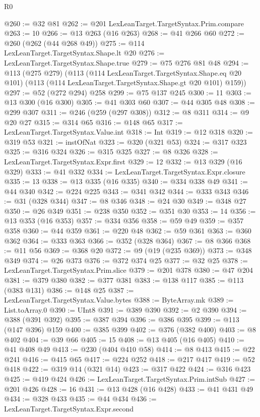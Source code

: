 \begin{lexlean}{R0}
\begin{coremodule}
{{{{{{{{{{{{{{{{{{{{{{{{{{{{{{{{{{{{{{{{{{{{{{{{{{{{{{{{{{{{{{{{{{{{{{{{{@260 := @32 @81
@262 := @201 LexLeanTarget.TargetSyntax.Prim.compare
@263 := 10
@266 := @13 @263 (@16 @263)
@268 := @41 @266 @60
@272 := @260 (@262 (@44 @268 @49))
@275 := @114 LexLeanTarget.TargetSyntax.Shape.lt @20
@276 := LexLeanTarget.TargetSyntax.Shape.true
@279 := @75 @276 @81 @48
@294 := @113
    (@275 @279)
    (@113
      (@114 LexLeanTarget.TargetSyntax.Shape.eq @20 @101)
      (@113 (@114 LexLeanTarget.TargetSyntax.Shape.gt @20 @101) @159))
@297 := @52 (@272 @294) @258
@299 := @75 @137 @245
@300 := 11
@303 := @13 @300 (@16 @300)
@305 := @41 @303 @60
@307 := @44 @305 @48
@308 := @299 @307
@311 := @246 (@259 (@297 @308))
@312 := @8 @311
@314 := @9 @20 @27
@315 := @314 @65
@316 := @148 @65
@317 := LexLeanTarget.TargetSyntax.Value.int
@318 := Int
@319 := @12 @318
@320 := @319 @53
@321 := instOfNat
@323 := @320 (@321 @53)
@324 := @317 @323
@325 := @316 @324
@326 := @315 @325
@327 := @8 @326
@328 := LexLeanTarget.TargetSyntax.Expr.first
@329 := 12
@332 := @13 @329 (@16 @329)
@333 := @41 @332
@334 := LexLeanTarget.TargetSyntax.Expr.closure
@335 := 13
@338 := @13 @335 (@16 @335)
@340 := @334 @338 @49
@341 := @44 @340
@342 := @224 @225
@343 := @341 @342
@344 := @333 @343
@346 := @31 (@328 @344)
@347 := @8 @346
@348 := @24 @30
@349 := @348 @27
@350 := @26 @349
@351 := @238 @350
@352 := @351 @30
@353 := 14
@356 := @13 @353 (@16 @353)
@357 := @334 @356
@358 := @59 @49
@359 := @357 @358
@360 := @44 @359
@361 := @220 @48
@362 := @59 @361
@363 := @360 @362
@364 := @333 @363
@366 := @352 (@328 @364)
@367 := @8 @366
@368 := @11 @56
@369 := @368 @20
@372 := @9 (@19 (@235 @369))
@373 := @348 @349
@374 := @26 @373
@376 := @372 @374 @25
@377 := @32 @25
@378 := LexLeanTarget.TargetSyntax.Prim.slice
@379 := @201 @378
@380 := @47 @204
@381 := @379 @380
@382 := @377 @381
@383 := @138 @117
@385 := @113 (@383 @131)
@386 := @148 @25
@387 := LexLeanTarget.TargetSyntax.Value.bytes
@388 := ByteArray.mk
@389 := List.toArray.{0}
@390 := UInt8
@391 := @389 @390
@392 := @2 @390
@394 := @388 (@391 @392)
@395 := @387 @394
@396 := @386 @395
@399 := @113 (@147 @396) @159
@400 := @385 @399
@402 := @376 (@382 @400)
@403 := @8 @402
@404 := @39 @66
@405 := 15
@408 := @13 @405 (@16 @405)
@410 := @41 @408 @49
@413 := @230 (@404 @410 @58)
@414 := @8 @413
@415 := @22 @241
@416 := @415 @65
@417 := @224 @252
@418 := @217 @417
@419 := @52 @418
@422 := @319 @14 (@321 @14)
@423 := @317 @422
@424 := @316 @423
@425 := @419 @424
@426 := LexLeanTarget.TargetSyntax.Prim.intSub
@427 := @201 @426
@428 := 16
@431 := @13 @428 (@16 @428)
@433 := @41 @431 @49
@434 := @328 @433
@435 := @44 @434
@436 := LexLeanTarget.TargetSyntax.Expr.second
}}}}}}}}}}}}}}}}}}}}}}}}}}}}}}}}}}}}}}}}}}}}}}}}}}}}}}}}}}}}}}}}}}}}}}}}}
\end{coremodule}
\end{lexlean}
